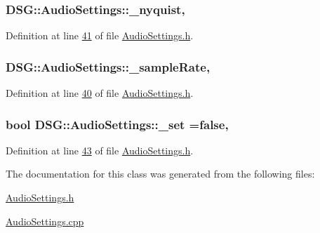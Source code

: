 \hypertarget{class_d_s_g_1_1_audio_settings_af3c7cbd15390d9bcbe39983c069390b5}{
\subsubsection[{\+\_\+nyquist}]{ D\+S\+G\+::\+Audio\+Settings\+::\+\_\+nyquist\hspace{0.3cm}{\ttfamily [static]}, {\ttfamily [protected]}}}\label{class_d_s_g_1_1_audio_settings_af3c7cbd15390d9bcbe39983c069390b5}


Definition at line \hyperlink{_audio_settings_8h_source_l00041}{41} of file \hyperlink{_audio_settings_8h_source}{Audio\+Settings.\+h}.

\hypertarget{class_d_s_g_1_1_audio_settings_a56869b51933f102b197f54001c8a1d27}{
\subsubsection[{\+\_\+sample\+Rate}]{ D\+S\+G\+::\+Audio\+Settings\+::\+\_\+sample\+Rate\hspace{0.3cm}{\ttfamily [static]}, {\ttfamily [protected]}}}\label{class_d_s_g_1_1_audio_settings_a56869b51933f102b197f54001c8a1d27}


Definition at line \hyperlink{_audio_settings_8h_source_l00040}{40} of file \hyperlink{_audio_settings_8h_source}{Audio\+Settings.\+h}.

\hypertarget{class_d_s_g_1_1_audio_settings_abd6bfacf2a290d84b3e20487dbf71fa3}{
\subsubsection[{\+\_\+set}]{\setlength{\rightskip}{0pt plus 5cm}bool D\+S\+G\+::\+Audio\+Settings\+::\+\_\+set =false\hspace{0.3cm}{\ttfamily [static]}, {\ttfamily [protected]}}}\label{class_d_s_g_1_1_audio_settings_abd6bfacf2a290d84b3e20487dbf71fa3}


Definition at line \hyperlink{_audio_settings_8h_source_l00043}{43} of file \hyperlink{_audio_settings_8h_source}{Audio\+Settings.\+h}.



The documentation for this class was generated from the following files\+:\begin{DoxyCompactItemize}
\item 
\hyperlink{_audio_settings_8h}{Audio\+Settings.\+h}\item 
\hyperlink{_audio_settings_8cpp}{Audio\+Settings.\+cpp}\end{DoxyCompactItemize}
